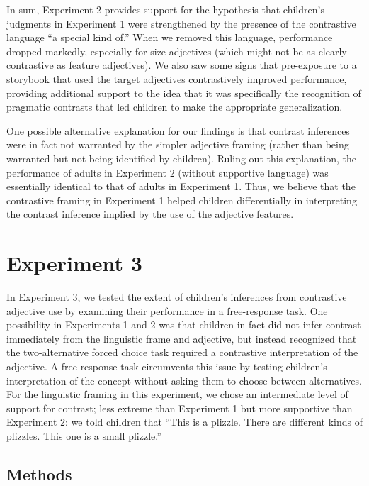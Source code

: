 \documentclass[man]{apa2}
\begin{document}
In sum, Experiment 2 provides support for the hypothesis that children's judgments in Experiment 1 were strengthened by the presence of the contrastive language ``a special kind of.'' When we removed this language, performance dropped markedly, especially for size adjectives (which might not be as clearly contrastive as feature adjectives). We also saw some signs that pre-exposure to a storybook that used the target adjectives contrastively improved performance, providing additional support to the idea that it was specifically the recognition of pragmatic contrasts that led children to make the appropriate generalization. 

One possible alternative explanation for our findings is that contrast inferences were in fact not warranted by the simpler adjective framing (rather than being warranted but not being identified by children). Ruling out this explanation, the performance of adults in Experiment 2 (without supportive language) was essentially identical to that of adults in Experiment 1. Thus, we believe that the contrastive framing in Experiment 1 helped children differentially in interpreting the contrast inference implied by the use of the adjective features. 

\section{Experiment 3} 

In Experiment 3, we tested the extent of children's inferences from contrastive adjective use by examining their performance in a free-response task. One possibility in Experiments 1 and 2 was that children in fact did not infer contrast immediately from the linguistic frame and adjective, but instead recognized that the two-alternative forced choice task required a contrastive interpretation of the adjective. A free response task circumvents this issue by testing children's interpretation of the concept without asking them to choose between alternatives. For the linguistic framing in this experiment, we chose an intermediate level of support for contrast; less extreme than Experiment 1 but more supportive than Experiment 2: we told children that ``This is a plizzle. There are different kinds of plizzles. This one is a small plizzle.'' 

\subsection{Methods}
\end{document}
